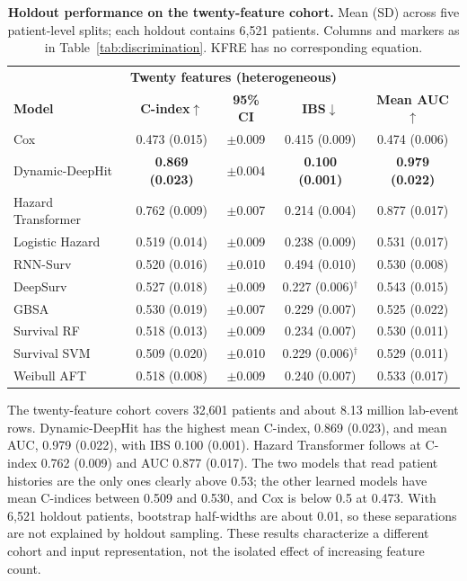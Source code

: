\begin{table}[h!]
\centering
\footnotesize
\setlength{\tabcolsep}{3pt}
\begin{tabular}{@{}lcccc@{}}
\toprule
\multicolumn{5}{c}{\textbf{Twenty features (heterogeneous)}} \\
\textbf{Model} & \textbf{C-index}$\uparrow$ & \textbf{95\% CI} & \textbf{IBS}$\downarrow$ & \textbf{Mean AUC}$\uparrow$ \\
\midrule
Cox & 0.473 (0.015) & $\pm$0.009 & 0.415 (0.009) & 0.474 (0.006) \\
Dynamic-DeepHit & \textbf{0.869 (0.023)} & $\pm$0.004 & \textbf{0.100 (0.001)} & \textbf{0.979 (0.022)} \\
Hazard Transformer & 0.762 (0.009) & $\pm$0.007 & 0.214 (0.004) & 0.877 (0.017) \\
Logistic Hazard & 0.519 (0.014) & $\pm$0.009 & 0.238 (0.009) & 0.531 (0.017) \\
RNN-Surv & 0.520 (0.016) & $\pm$0.010 & 0.494 (0.010) & 0.530 (0.008) \\
DeepSurv & 0.527 (0.018) & $\pm$0.009 & 0.227 (0.006)$^{\dagger}$ & 0.543 (0.015) \\
GBSA & 0.530 (0.019) & $\pm$0.007 & 0.229 (0.007) & 0.525 (0.022) \\
Survival RF & 0.518 (0.013) & $\pm$0.009 & 0.234 (0.007) & 0.530 (0.011) \\
Survival SVM & 0.509 (0.020) & $\pm$0.010 & 0.229 (0.006)$^{\dagger}$ & 0.529 (0.011) \\
Weibull AFT & 0.518 (0.008) & $\pm$0.009 & 0.240 (0.007) & 0.533 (0.017) \\
\bottomrule
\end{tabular}
\caption{{\bf Holdout performance on the twenty-feature cohort.} Mean (SD) across five patient-level splits; each holdout contains 6{,}521 patients. Columns and markers as in Table~\ref{tab:discrimination}. KFRE has no corresponding equation.}
\label{tab:twenty}
\end{table}

The twenty-feature cohort covers 32{,}601 patients and about 8.13 million lab-event rows. Dynamic-DeepHit has the highest mean C-index, 0.869 (0.023), and mean AUC, 0.979 (0.022), with IBS 0.100 (0.001). Hazard Transformer follows at C-index 0.762 (0.009) and AUC 0.877 (0.017). The two models that read patient histories are the only ones clearly above 0.53; the other learned models have mean C-indices between 0.509 and 0.530, and Cox is below 0.5 at 0.473. With 6{,}521 holdout patients, bootstrap half-widths are about 0.01, so these separations are not explained by holdout sampling. These results characterize a different cohort and input representation, not the isolated effect of increasing feature count.

